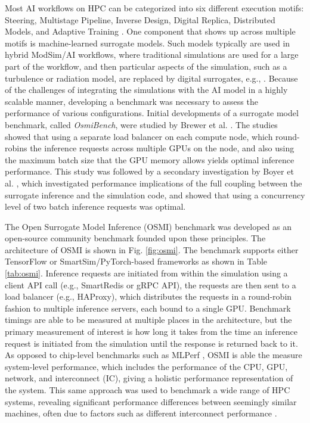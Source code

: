 \documentclass[sigconf]{acmart}
\begin{document}
Most AI workflows on HPC can be categorized into six different execution motifs: Steering, Multistage Pipeline, Inverse Design, Digital Replica, Distributed Models, and Adaptive Training \cite{brewer2024ai}. One component that shows up across multiple motifs is machine-learned surrogate models. Such models typically are used in hybrid ModSim/AI workflows, where traditional simulations are used for a large part of the workflow, and then particular aspects of the simulation, such as a turbulence or radiation model, are replaced by digital surrogates, e.g., \cite{partee2022using, martinez2022roam, bhushan2023assessment}. Because of the challenges of integrating the simulations with the AI model in a highly scalable manner, developing a benchmark was necessary to assess the performance of various configurations. Initial developments of a surrogate model benchmark, called {\em OsmiBench}, were studied by Brewer et al. \cite{brewer2021production}. The studies showed that using a separate load balancer on each compute node, which round-robins the inference requests across multiple GPUs on the node, and also using the maximum batch size that the GPU memory allows yields optimal inference performance. This study was followed by a secondary investigation by Boyer et al. \cite{boyer2022scalable}, which investigated performance implications of the full coupling between the surrogate inference and the simulation code, and showed that using a concurrency level of two batch inference requests was optimal. 

The Open Surrogate Model Inference (OSMI) benchmark was developed as an open-source community benchmark founded upon these principles. The architecture of OSMI is shown in Fig. \ref{fig:osmi}. The benchmark supports either TensorFlow or SmartSim/PyTorch-based frameworks as shown in Table \ref{tab:osmi}. Inference requests are initiated from within the simulation using a client API call (e.g., SmartRedis or gRPC API), the requests are then sent to a load balancer (e.g., HAProxy), which distributes the requests in a round-robin fashion to multiple inference servers, each bound to a single GPU. Benchmark timings are able to be measured at multiple places in the architecture, but the primary measurement of interest is how long it takes from the time an inference request is initiated from the simulation until the response is returned back to it. As opposed to chip-level benchmarks such as MLPerf \cite{reddi2020mlperf}, OSMI is able the measure system-level performance, which includes the performance of the CPU, GPU, network, and interconnect (IC), giving a holistic performance representation of the system. This same approach was used to benchmark a wide range of HPC systems, revealing significant performance differences between seemingly similar machines, often due to factors such as different interconnect performance \cite{brewer2020inference}.
\end{document}
